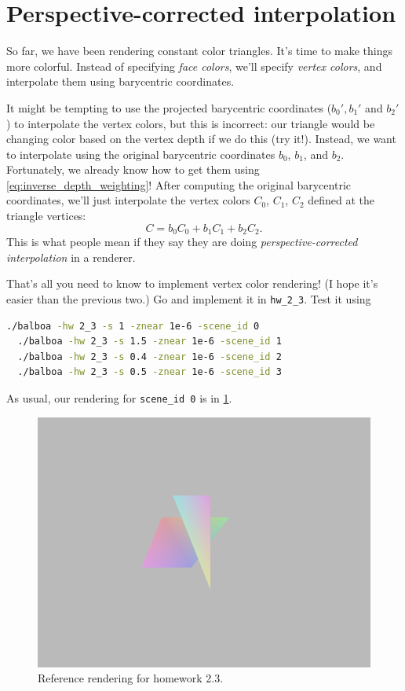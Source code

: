 \section{Perspective-corrected interpolation}

So far, we have been rendering constant color triangles. It's time to make things more colorful. Instead of specifying \emph{face colors}, we'll specify \emph{vertex colors}, and interpolate them using barycentric coordinates.

It might be tempting to use the projected barycentric coordinates ($b_0', b_1'$ and $b_2'$) to interpolate the vertex colors, but this is incorrect: our triangle would be changing color based on the vertex depth if we do this (try it!). Instead, we want to interpolate using the original barycentric coordinates $b_0$, $b_1$, and $b_2$. Fortunately, we already know how to get them using \cref{eq:inverse_depth_weighting}! After computing the original barycentric coordinates, we'll just interpolate the vertex colors $C_0$, $C_1$, $C_2$ defined at the triangle vertices:
\begin{equation}
C = b_0 C_0 + b_1 C_1 + b_2 C_2.
\end{equation}
This is what people mean if they say they are doing \emph{perspective-corrected interpolation} in a renderer.

That's all you need to know to implement vertex color rendering! (I hope it's easier than the previous two.) Go and implement it in \lstinline{hw_2_3}. Test it using
\begin{lstlisting}[language=bash]
  ./balboa -hw 2_3 -s 1 -znear 1e-6 -scene_id 0
  ./balboa -hw 2_3 -s 1.5 -znear 1e-6 -scene_id 1
  ./balboa -hw 2_3 -s 0.4 -znear 1e-6 -scene_id 2
  ./balboa -hw 2_3 -s 0.5 -znear 1e-6 -scene_id 3
\end{lstlisting}

As usual, our rendering for \lstinline{scene_id 0} is in \cref{fig:hw2_3}.
\begin{figure}[h]
    \centering
    \includegraphics[width=0.5\linewidth]{imgs/hw_2_3.png}
    \caption{Reference rendering for homework 2.3.}
    \label{fig:hw2_3}
\end{figure}

